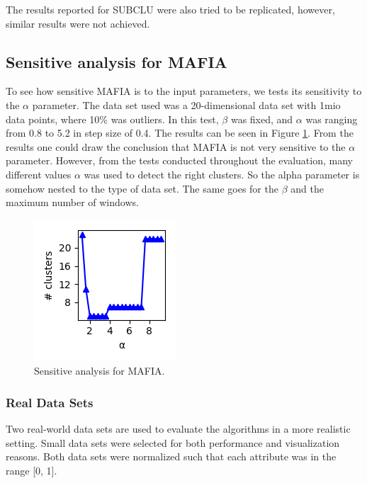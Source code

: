 The results reported for SUBCLU \cite{subclu} were also tried to be replicated, however, similar results were not achieved.

\subsection{Sensitive analysis for MAFIA}
To see how sensitive MAFIA is to the input parameters, we tests its sensitivity to the $\alpha$ parameter. The data set used was a 20-dimensional data set with 1mio data points, where 10\% was outliers. In this test, $\beta$ was fixed, and $\alpha$ was ranging from 0.8 to 5.2 in step size of 0.4. The results can be seen in Figure \ref{fig:sensitivity_alpha}. From the results one could draw the conclusion that MAFIA is not very sensitive to the $\alpha$ parameter. However, from the tests conducted throughout the evaluation, many different values $\alpha$ was used to detect the right clusters. So the alpha parameter is somehow nested to the type of data set. The same goes for the $\beta$ and the maximum number of windows.
\begin{figure}
    \centering
    \includegraphics[scale=0.6]{figures/sensitivity_alpha.png}
    \caption{Sensitive analysis for MAFIA.}
    \label{fig:sensitivity_alpha}
\end{figure}

\subsubsection{Real Data Sets}
Two real-world data sets are used to evaluate the algorithms in a more realistic setting. Small data sets were selected for both performance and visualization reasons. Both data sets were normalized such that each attribute was in the range [0, 1].


